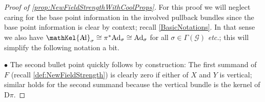 \documentclass[reqno,a4paper,oneside]{amsart}
\theoremstyle{plain}
\theoremstyle{remark}
\theoremstyle{definition}
\DeclareMathOperator{\sAd}{\mathKel{A\mkern-5.5mu d}}
\begin{document}
\begin{proof}[Proof of \ref{prop:NewFieldStrengthWithCoolProps}]
\leavevmode\newline
For this proof we will neglect caring for the base point information in the involved pullback bundles since the base point information is clear by context; recall \ref{BasicNotations}. In that sense we also have $\sAd_\sigma \cong \pi^*\mathrm{Ad}_\sigma \cong \mathrm{Ad}_\sigma$ for all $\sigma \in \Gamma(\mathcal{G})$ \textit{etc.}; this will simplify the following notation a bit.

$\bullet$ The second bullet point quickly follows by construction: The first summand of $F$ (recall \ref{def:NewFieldStrength}) is clearly zero if either of $X$ and $Y$ is vertical; similar holds for the second summand because the vertical bundle is the kernel of $\mathrm{D}\pi$.


\end{proof}
\end{document}
